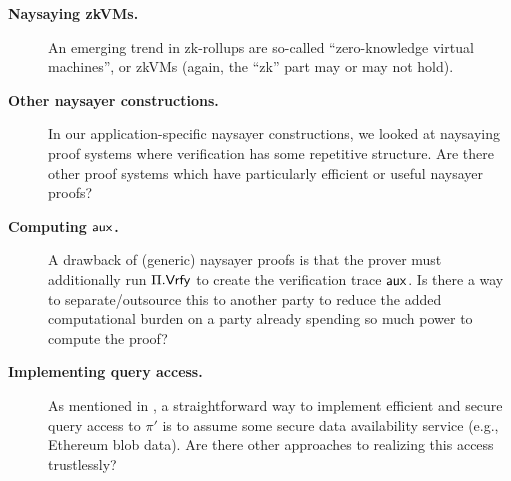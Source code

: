 \begin{description}
    \item[\textbf{Naysaying zkVMs.}] An emerging trend in zk-rollups are so-called ``zero{\hyp}knowledge virtual machines'', or zkVMs (again, the ``zk'' part may or may not hold). 
    \item[\textbf{Other naysayer constructions.}] In our application-specific naysayer constructions, we looked at naysaying proof systems where verification has some repetitive structure. Are there other proof systems which have particularly efficient or useful naysayer proofs? 
    \item[\textbf{Computing $\mathsf{aux}$.}] A drawback of (generic) naysayer proofs is that the prover must additionally run $\Pi.\mathsf{Vrfy}$ to create the verification trace $\mathsf{aux}$. Is there a way to separate/outsource this to another party to reduce the added computational burden on a party already spending so much power to compute the proof?
    \item[\textbf{Implementing query access.}] As mentioned in , a straightforward way to implement efficient and secure query access to $\pi'$ is to assume some secure data availability service (e.g., Ethereum blob data). Are there other approaches to realizing this access trustlessly?
    \item[]
\end{description}
